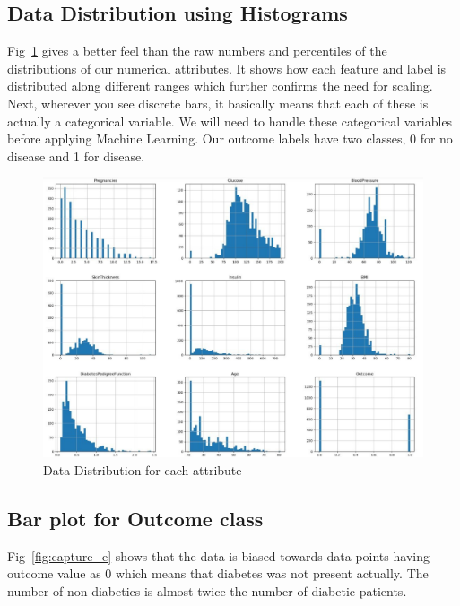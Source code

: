 \subsection{Data Distribution using Histograms}
Fig~\ref{fig:capture_d} gives a better feel than the raw numbers and percentiles of the distributions of our numerical attributes. It shows how each feature and label is distributed along different ranges which further confirms the need for scaling. Next, wherever you see discrete bars, it basically means that each of these is actually a categorical variable. We will need to handle these categorical variables before applying Machine Learning. Our outcome labels have two classes, 0 for no disease and 1 for disease. 
\begin{figure}[ht]
    \centering    \includegraphics[scale=0.8]{figures/data_attr_distribution.pdf}
    \caption{Data Distribution for each attribute}
    \label{fig:capture_d}
\end{figure}

\subsection{Bar plot for Outcome class}
Fig~\ref{fig:capture_e} shows that the data is biased towards data points having outcome value as 0 which means that diabetes was not present actually. The number of non-diabetics is almost twice the number of diabetic patients.

